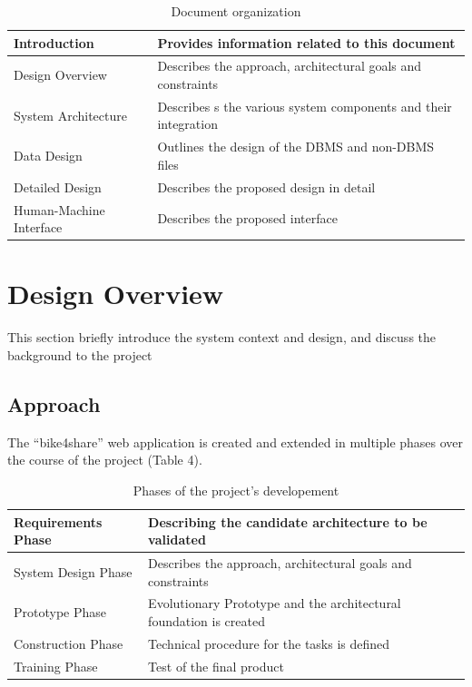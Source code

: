 \documentclass{article}
\begin{document}
\begin{table} [H]
    \begin{center}
        \begin{tabular}{|l|p{}|}
            \hline
            Introduction &   Provides information related to this document         \\ 
            \hline
            Design Overview &  
            Describes the approach, architectural goals and constraints \\
            \hline
            System Architecture &  
            Describes s the various system components and their integration \\
            \hline
            Data Design & Outlines the design of the DBMS and non-DBMS files \\
            \hline
            Detailed Design & Describes the proposed design in detail 
            \\
            \hline
             Human-Machine Interface & Describes the proposed interface
            \\
            \hline
        \end{tabular}
    \end{center}
\caption{Document organization}
\end{table}
\newpage
\section{Design Overview}
This section briefly introduce the system context and design, and discuss the background to the project
\subsection{Approach}
The “bike4share” web application is created and extended in multiple phases over the course of the project (Table 4).
\begin{table} [H]
    \begin{center}
        \begin{tabular}{|l|p{}|}
            \hline
            Requirements Phase &   Describing the candidate architecture to be validated         \\
            \hline
            System Design Phase &  
            Describes the approach, architectural goals and constraints \\
            \hline
            Prototype Phase &  
            Evolutionary Prototype and the architectural foundation is created    \\
            \hline
            Construction Phase & Technical procedure for the tasks is defined \\
            \hline
            Training Phase & Test of the final product
            \\
            \hline
        \end{tabular}
    \end{center}
\caption{Phases of the project's developement}
\end{table}
\end{document}
